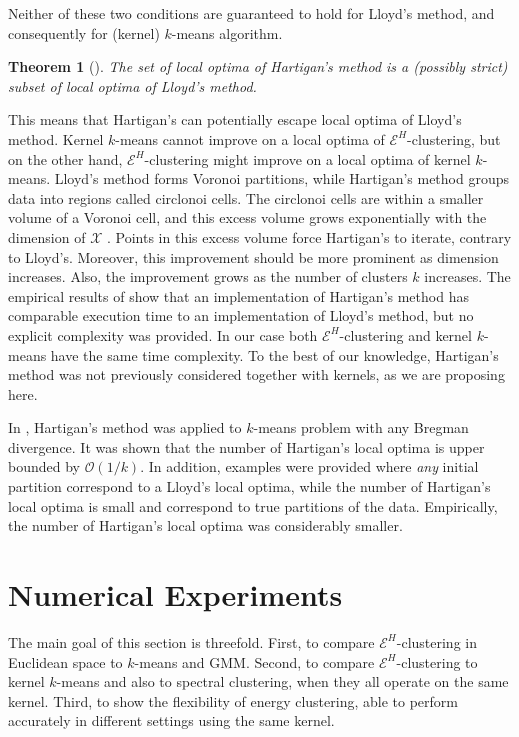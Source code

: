 \documentclass[twoside]{article}
\newtheorem{theorem}{Theorem}
\begin{document}
Neither of these two conditions are guaranteed to hold 
for Lloyd's method,
and consequently for (kernel) $k$-means algorithm. 

\begin{theorem}[\cite{Telgarsky}]
The set of local optima of Hartigan's method is a (possibly strict) subset
of local optima of Lloyd's method.
\end{theorem}

This means that Hartigan's can potentially 
escape local optima of Lloyd's method.
Kernel $k$-means cannot
improve on a local optima of $\mathcal{E}^H$-clustering, but on the other hand,
$\mathcal{E}^H$-clustering might improve on a local optima of 
kernel $k$-means. 
Lloyd's method forms Voronoi partitions,
while Hartigan's method groups data
into regions called circlonoi cells.
The circlonoi cells are within
a smaller volume of a Voronoi cell, and this excess volume grows
exponentially with the dimension of $\mathcal{X}$ 
\citep[Theorems 2.4 and 3.1]{Telgarsky}. 
Points in this excess volume
force Hartigan's to iterate, contrary
to Lloyd's. 
Moreover, this improvement should be more prominent as
dimension increases. Also, the improvement grows as the number of clusters
$k$ increases.
The empirical results of \citep{Telgarsky} show that 
an implementation of Hartigan's method has comparable execution time 
to an implementation of
Lloyd's method,
but no explicit complexity was provided. In our case both
$\mathcal{E}^H$-clustering and kernel $k$-means
have the same time complexity. To the best of our knowledge, Hartigan's
method was not previously considered together with kernels, as we 
are proposing here.

In \citep{Slonin}, Hartigan's method was applied to $k$-means problem
with any Bregman divergence. It was shown that the number of Hartigan's
local optima is upper bounded by $\mathcal{O}(1/k)$. 
In addition, examples were provided where
\emph{any} initial partition correspond to a Lloyd's local optima, while  
the number of Hartigan's local optima  is small and 
correspond to true partitions of the data. Empirically, the number of
Hartigan's local optima was considerably smaller.


\section{Numerical Experiments}
\label{sec:numerics}

The main goal of this section is threefold. First, to compare
$\mathcal{E}^H$-clustering in Euclidean space 
to $k$-means and GMM. 
Second, to compare $\mathcal{E}^H$-clustering  to
kernel $k$-means and also to spectral clustering, when they all operate
on the same kernel.
Third, to show the flexibility
of energy clustering, able to perform 
accurately in different settings using the same kernel.
\end{document}
